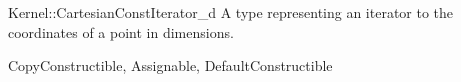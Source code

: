 \begin{ccRefConcept}{Kernel::CartesianConstIterator_d}
A type representing an iterator to the  coordinates of a point
in  dimensions.

\ccRefines
CopyConstructible, Assignable, DefaultConstructible

\ccIsModel
{} 

\ccSeeAlso
{} \\

\end{ccRefConcept}
